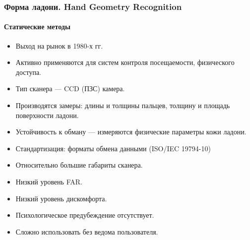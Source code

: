 \begin{frame}[allowframebreaks]
\frametitle{Форма ладони. Hand Geometry Recognition}
\framesubtitle{Статические методы}

\begin{figure}
    \begin{center}
    \end{center}
\end{figure} 

\begin{itemize}
    \item Выход на рынок в 1980-х гг.
    \item Активно применяются для систем контроля посещаемости, физического доступа.
    \item Тип сканера --- CCD (ПЗС) камера.
    \item Производятся замеры: длины и толщины пальцев, толщину и площадь поверхности ладони.
    \item Устойчивость к обману --- измеряются физические параметры кожи ладони.
    \item Стандартизация: форматы обмена данными (ISO/IEC 19794-10) 
    \item Относительно большие габариты сканера.
    \item Низкий уровень FAR.
    \item Низкий уровень дискомфорта.
    \item Психологическое предубеждение отсутствует.
    \item Сложно использовать без ведома пользователя.
\end{itemize}
\end{frame}


